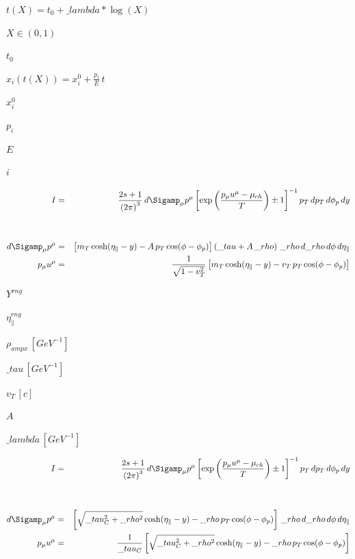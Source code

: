 \documentclass{article}
\begin{document}
$ t(X) = t_0 + \_lambda * \log(X) $
\pagebreak

$ X \in (0,1) $
\pagebreak

$ t_0 $
\pagebreak

$ x_{i}(t(X)) = x^{0}_{i} + \frac{p_{i}}{E} \,t $
\pagebreak

$ x^{0}_{i} $
\pagebreak

$ p_{i} $
\pagebreak

$ E $
\pagebreak

$ i $
\pagebreak

\begin{eqnarray}  I         &=& \frac{2 s+1}{\left(2\pi\right)^3} \,d\Sigamp_\mu p^\mu \left[ \exp \left( \frac{p_\mu u^\mu - \mu_{ch}}{T}\right) \pm 1\right]^{-1} p_T \,dp_T \,d\phi_p \,dy \nonumber \\
  \nonumber\\ \nonumber\\
  d\Sigamp_\mu p^\mu    &=& \left[ m_T \cosh(\eta_\parallel - y) - A  \,p_T \cos(\phi - \phi_p) \right] \left( \_tau  + A \,\_rho \right) \,\_rho \,d\_rho \,d\phi \,d\eta_\parallel \nonumber \nonumber \\
  p_\mu u^\mu   &=& \frac{1}{\sqrt{1-v_T^2}} \left[ m_T \cosh(\eta_\parallel - y) - v_T \,p_T \cos(\phi - \phi_p)\right] \nonumber
\end{eqnarray}
\pagebreak

$ Y^{rng} $
\pagebreak

$ \eta_\parallel^{rng} $
\pagebreak

$ \rho_{ampx} \,[GeV^{-1}] $
\pagebreak

$ \_tau  \,[GeV^{-1}] $
\pagebreak

$ v_T \,[c] $
\pagebreak

$ A $
\pagebreak

$ \_lambda \,[GeV^{-1}]$
\pagebreak

\begin{eqnarray}  I         &=& \frac{2 s+1}{\left(2\pi\right)^3} \,d\Sigamp_\mu p^\mu \left[ \exp \left( \frac{p_\mu u^\mu - \mu_{ch}}{T}\right) \pm 1\right]^{-1} p_T \,dp_T \,d\phi_p \,dy \nonumber \\
  \nonumber\\ \nonumber\\
  d\Sigamp_\mu p^\mu    &=& \left[ \sqrt{\_tau _C^2 + \_rho^2} \cosh(\eta_\parallel - y) - \_rho \,p_T \cos(\phi - \phi_p)\right] \,\_rho \,d\_rho \,d\phi \,d\eta_\parallel \nonumber \nonumber \\
  p_\mu u^\mu   &=& \frac{1}{\_tau _C} \left[ \sqrt{\_tau _C^2 + \_rho^2} \cosh(\eta_\parallel - y) - \_rho \,p_T \cos(\phi - \phi_p)\right] \nonumber
\end{eqnarray}
\pagebreak
\end{document}
